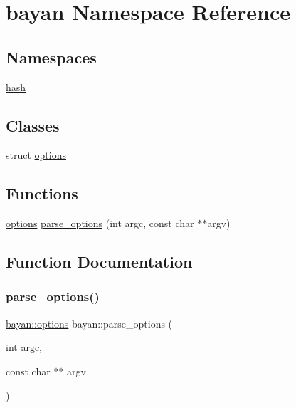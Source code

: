 \hypertarget{namespacebayan}{}\section{bayan Namespace Reference}
\label{namespacebayan}
\subsection*{Namespaces}
\begin{DoxyCompactItemize}
\item 
 \hyperlink{namespacebayan_1_1hash}{hash}
\end{DoxyCompactItemize}
\subsection*{Classes}
\begin{DoxyCompactItemize}
\item 
struct \hyperlink{structbayan_1_1options}{options}
\end{DoxyCompactItemize}
\subsection*{Functions}
\begin{DoxyCompactItemize}
\item 
\hyperlink{structbayan_1_1options}{options} \hyperlink{namespacebayan_aa357fd1ddce71ed465f7fa6bd8f8f2e3}{parse\+\_\+options} (int argc, const char $\ast$$\ast$argv)
\end{DoxyCompactItemize}


\subsection{Function Documentation}
\mbox{\label{namespacebayan_aa357fd1ddce71ed465f7fa6bd8f8f2e3}} 
\subsubsection{\texorpdfstring{parse\+\_\+options()}{parse\_options()}}
{\footnotesize\ttfamily \hyperlink{structbayan_1_1options}{bayan\+::options} bayan\+::parse\+\_\+options (\begin{DoxyParamCaption}\item[{int}]{argc,  }\item[{const char $\ast$$\ast$}]{argv }\end{DoxyParamCaption})}

